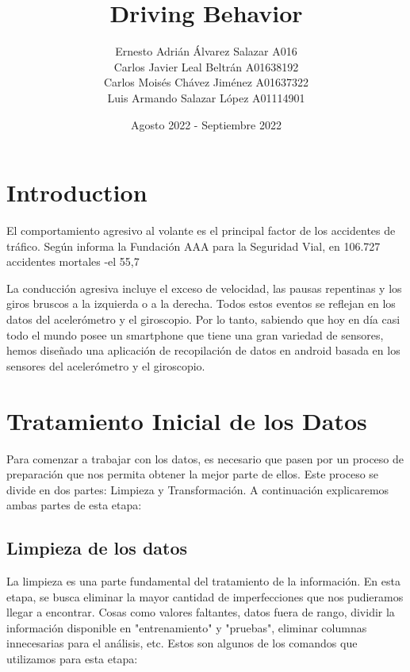 \documentclass{article}
\title{Driving Behavior}
\author{
Ernesto Adrián Álvarez Salazar  A016\\
Carlos Javier Leal Beltrán  A01638192\\
Carlos Moisés Chávez Jiménez  A01637322\\
Luis Armando Salazar López  A01114901\\
}
\date{Agosto 2022 - Septiembre 2022}
\begin{document}
\maketitle

\section{Introduction}
El comportamiento agresivo al volante es el principal factor de los accidentes de tráfico. Según informa la Fundación AAA para la Seguridad Vial, en 106.727 accidentes mortales -el 55,7%

La conducción agresiva incluye el exceso de velocidad, las pausas repentinas y los giros bruscos a la izquierda o a la derecha. Todos estos eventos se reflejan en los datos del acelerómetro y el giroscopio. Por lo tanto, sabiendo que hoy en día casi todo el mundo posee un smartphone que tiene una gran variedad de sensores, hemos diseñado una aplicación de recopilación de datos en android basada en los sensores del acelerómetro y el giroscopio.

\section{Tratamiento Inicial de los Datos}

Para comenzar a trabajar con los datos, es necesario que pasen por un proceso de preparación que nos permita obtener la mejor parte de ellos. Este proceso se divide en dos partes: Limpieza y Transformación. A continuación explicaremos ambas partes de esta etapa:

    \subsection{Limpieza de los datos}

        La limpieza es una parte fundamental del tratamiento de la información. En esta etapa, se busca eliminar la mayor cantidad de imperfecciones que nos pudieramos llegar a encontrar. Cosas como valores faltantes, datos fuera de rango, dividir la información disponible en "entrenamiento" y "pruebas", eliminar columnas innecesarias para el análisis, etc. Estos son algunos de los comandos que utilizamos para esta etapa:
\end{document}
